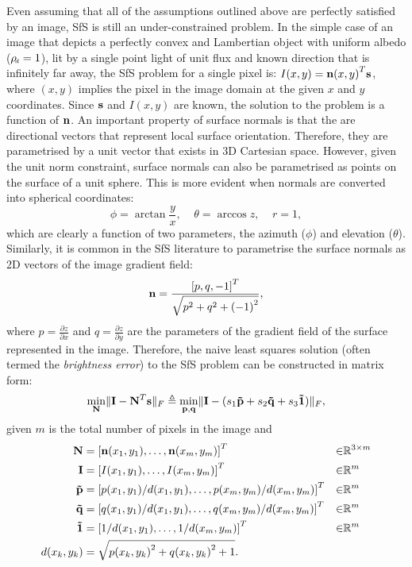 Even assuming that all of the assumptions outlined above are perfectly
satisfied by an image, SfS is still an under-constrained problem. In the
simple case of an image that depicts a perfectly convex and Lambertian
object with uniform albedo ($\rho_{\smallsub{d}} = 1$), lit by a single
point light of unit flux and known direction that is infinitely far away, the
SfS problem for a single pixel is: $I(x, y) = {\boldsymbol{\mathbf{n}}(x, y)}^T \boldsymbol{\mathbf{s}}$,
where $(x, y)$ implies the pixel in the image domain at the given $x$ and $y$
coordinates.
Since $\boldsymbol{\mathbf{s}}$ and $I(x, y)$ are known, the solution to the problem is a
function of $\boldsymbol{\mathbf{n}}$. An important property of surface normals is that the are
directional vectors that represent local surface orientation. Therefore, they
are parametrised by a unit vector that exists in 3D Cartesian space. However, given the unit norm constraint, surface normals can
also be parametrised as points on the surface of a unit sphere. This is more
evident when normals are converted into spherical coordinates:
\begin{equation}\label{eq:bg_sfs_normal_spherical}
    \phi = \arctan{\frac{y}{x}}, \;\;\;\; \theta = \arccos{z}, \;\;\;\; r = 1,
\end{equation}
which are clearly a function of two parameters, the azimuth ($\phi$) and
elevation ($\theta$). Similarly, it is common in the SfS literature to
parametrise the surface normals as 2D vectors of the image gradient field:
\begin{equation}\label{eq:bg_sfs_normal_pq}
    \boldsymbol{\mathbf{n}} = \frac{{[p, q, -1]}^T}{\sqrt{p^2 + q^2 + {(-1)}^2}},
\end{equation}
where $p = \frac{\partial z}{\partial x}$ and
$q = \frac{\partial z}{\partial y}$ are the parameters of the gradient field
of the surface represented in the image. Therefore, the naive least squares
solution (often termed the \textit{brightness error}) to the SfS problem can be
constructed in matrix form:
\begin{equation}\label{eq:bg_sfs_least_squares_lambert}
    \min_{\boldsymbol{\mathbf{N}}} \lVert \boldsymbol{\mathbf{I}} - \boldsymbol{\mathbf{N}}^T \boldsymbol{\mathbf{s}} \rVert_F \triangleq
    \min_{\boldsymbol{\mathbf{p}}, \boldsymbol{\mathbf{q}}} \lVert \boldsymbol{\mathbf{I}} - (s_1 \boldsymbol{\mathbf{\tilde{p}}} + s_2 \boldsymbol{\mathbf{\tilde{q}}} + s_3 \boldsymbol{\mathbf{\tilde{1}}}) \rVert_F,
\end{equation}
given $m$ is the total number of pixels in the image and
\begin{align*}
    \boldsymbol{\mathbf{N}} &= {[\boldsymbol{\mathbf{n}}(x_1, y_1), \ldots, \boldsymbol{\mathbf{n}}(x_m, y_m)]}^T &\in &\mathbb{R}^{3 \times m} \\
	\boldsymbol{\mathbf{I}} &= {[I(x_1, y_1), \ldots, I(x_m, y_m)]}^T &\in &\mathbb{R}^{m} \\
	\boldsymbol{\mathbf{\tilde{p}}} &= {[p(x_1, y_1) / d(x_1, y_1), \ldots, p(x_m, y_m) / d(x_m, y_m)]}^T &\in &\mathbb{R}^{m} \\
	\boldsymbol{\mathbf{\tilde{q}}} &= {[q(x_1, y_1) / d(x_1, y_1), \ldots, q(x_m, y_m) / d(x_m, y_m)]}^T &\in &\mathbb{R}^{m} \\
 	\boldsymbol{\mathbf{\tilde{1}}} &= {[1 / d(x_1, y_1), \ldots, 1 / d(x_m, y_m)]}^T &\in &\mathbb{R}^{m} \\
	d(x_k, y_k) &= \sqrt{{p(x_k, y_k)}^2 + {q(x_k, y_k)}^2 + 1}. & &
\end{align*}
